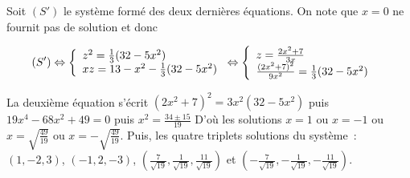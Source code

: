{{Soit $(S')$ le système formé des deux dernières équations. On note que $x=0$ ne fournit pas de solution et donc

\begin{align*}\ensuremath
(S')&\Leftrightarrow\left\{
\begin{array}{l}
z^2=\frac{1}{3}(32-5x^2)\\
xz=13-x^2-\frac{1}{3}(32-5x^2)
\end{array}
\right.\Leftrightarrow\left\{
\begin{array}{l}
z=\frac{2x^2+7}{3x}\\
\frac{(2x^2+7)^2}{9x^2}=\frac{1}{3}(32-5x^2)
\end{array}
\right.
\end{align*}

La deuxième équation s'écrit $(2x^2+7)^2=3x^2(32-5x^2)$ puis $19x^4-68x^2+49=0$ puis $x^2=\frac{34\pm15}{19}$
D'où les solutions $x=1$ ou $x=-1$ ou $x=\sqrt{\frac{49}{19}}$ ou $x=-\sqrt{\frac{49}{19}}$. Puis, les quatre triplets solutions du système~:~$(1,-2,3)$, $(-1,2,-3)$, $(\frac{7}{\sqrt{19}},\frac{1}{\sqrt{19}},\frac{11}{\sqrt{19}})$ et $(-\frac{7}{\sqrt{19}},-\frac{1}{\sqrt{19}},-\frac{11}{\sqrt{19}})$.}
}